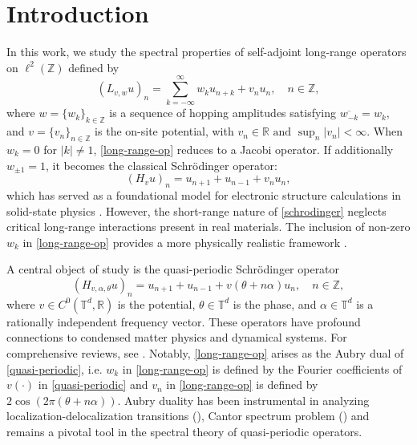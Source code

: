 \documentclass[11pt]{amsart}
\theoremstyle{remark}
\theoremstyle{definition}
\newcommand{\R}{{\mathbf R}}
\newcommand{\T}{{\mathbf T}}
\def\R{{\mathbb R}}
\def\T{{\mathbb T}}
\begin{document}
\maketitle



\section{Introduction}
In this work, we study the spectral properties of self-adjoint long-range operators on $\ell^2(\mathbb{Z})$ defined by
\begin{equation}\label{long-range-op}
    (L_{v,w}u)_n = \sum_{k=-\infty}^{\infty} w_k u_{n+k} + v_nu_n, \quad n \in \mathbb{Z},
\end{equation}
where $w = \{w_k\}_{k \in \mathbb{Z}}$ is a sequence of hopping amplitudes satisfying $\overline{w_{-k}} = w_k$, and $v = \{v_n\}_{n \in \mathbb{Z}}$ is the on-site potential, with $v_n\in \R \text{ and }\sup_n |v_n| < \infty$.
When $w_k = 0$ for $|k| \neq 1$, \eqref{long-range-op} reduces to a Jacobi operator. If additionally $w_{\pm 1} = 1$, it becomes the classical Schr\"odinger operator:
\begin{equation}\label{schrodinger}
    (H_{v}u)_n = u_{n+1} + u_{n-1} + v_nu_n,
\end{equation}
which has served as a foundational model for electronic structure calculations in solid-state physics \cite{Anderson,AA}. However, the short-range nature of \eqref{schrodinger} neglects critical long-range interactions present in real materials. The inclusion of non-zero $w_k$ in \eqref{long-range-op} provides a more physically realistic framework \cite{bid,Rod,Sar}.


A central object of study is the quasi-periodic Schr\"odinger operator
\begin{equation}\label{quasi-periodic}
    (H_{ v,\alpha,\theta}u)_n = u_{n+1} + u_{n-1} +  v(\theta + n\alpha)u_n, \quad n \in \mathbb{Z},
\end{equation}
where $v \in C^0(\mathbb{T}^d, \mathbb{R})$ is the potential, $\theta \in \mathbb{T}^d$ is the phase, and $\alpha \in \T^d$ is a rationally independent frequency vector. These operators have profound connections to condensed matter physics and dynamical systems. For comprehensive reviews, see \cite{DF,DF2,J,Y}.  Notably, \eqref{long-range-op} arises as the Aubry dual of \eqref{quasi-periodic}, i.e. $w_k$ in \eqref{long-range-op} is defined by the Fourier coefficients of $v(\cdot)$ in \eqref{quasi-periodic} and $v_n$ in \eqref{long-range-op} is defined by $2\cos(2\pi(\theta + n\alpha))$. Aubry duality has been instrumental in analyzing localization-delocalization transitions (\cite{AJ2,AYZ,BJ,GJ,JK,Puig1}), Cantor spectrum problem (\cite{AJ3,GJY,Puig1,Puig11}) and remains a pivotal tool in the spectral theory of quasi-periodic operators.
\end{document}
